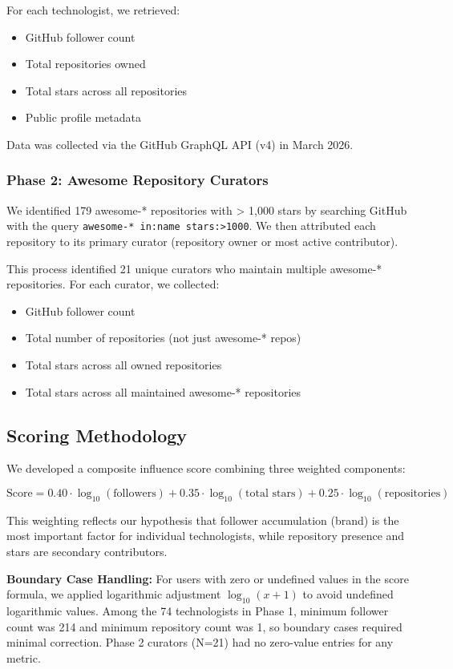 \documentclass[11pt]{article}
\begin{document}
For each technologist, we retrieved:
\begin{itemize}
    \item GitHub follower count
    \item Total repositories owned
    \item Total stars across all repositories
    \item Public profile metadata
\end{itemize}

Data was collected via the GitHub GraphQL API (v4) in March 2026.

\subsubsection{Phase 2: Awesome Repository Curators}

We identified 179 awesome-* repositories with > 1,000 stars by searching GitHub with the query \texttt{awesome-* in:name stars:>1000}. We then attributed each repository to its primary curator (repository owner or most active contributor).

This process identified 21 unique curators who maintain multiple awesome-* repositories. For each curator, we collected:
\begin{itemize}
    \item GitHub follower count
    \item Total number of repositories (not just awesome-* repos)
    \item Total stars across all owned repositories
    \item Total stars across all maintained awesome-* repositories
\end{itemize}

\subsection{Scoring Methodology}

We developed a composite influence score combining three weighted components:

\[
\text{Score} = 0.40 \cdot \log_{10}(\text{followers}) + 0.35 \cdot \log_{10}(\text{total stars}) + 0.25 \cdot \log_{10}(\text{repositories})
\]

This weighting reflects our hypothesis that follower accumulation (brand) is the most important factor for individual technologists, while repository presence and stars are secondary contributors.

\textbf{Boundary Case Handling:} For users with zero or undefined values in the score formula, we applied logarithmic adjustment $\log_{10}(x + 1)$ to avoid undefined logarithmic values. Among the 74 technologists in Phase 1, minimum follower count was 214 and minimum repository count was 1, so boundary cases required minimal correction. Phase 2 curators (N=21) had no zero-value entries for any metric.
\end{document}
